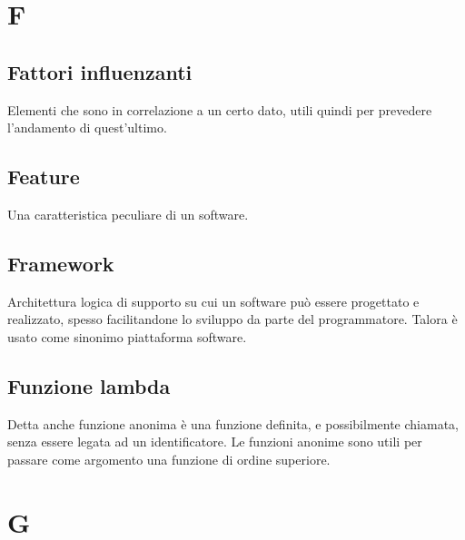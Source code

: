 \clearpage
\section*{F}

\subsection*{Fattori influenzanti}
Elementi che sono in correlazione a un certo dato, utili quindi per prevedere l'andamento di quest'ultimo.

\subsection*{Feature}
Una caratteristica peculiare di un software.

\subsection*{Framework}
Architettura logica di supporto su cui un software può essere progettato e realizzato, spesso facilitandone lo sviluppo da parte del programmatore. Talora è usato come sinonimo piattaforma software.

\subsection*{Funzione lambda}
Detta anche funzione anonima è una funzione definita, e possibilmente chiamata, senza essere legata ad un identificatore. Le funzioni anonime sono utili per passare come argomento una funzione di ordine superiore.


\clearpage
\section*{G}



